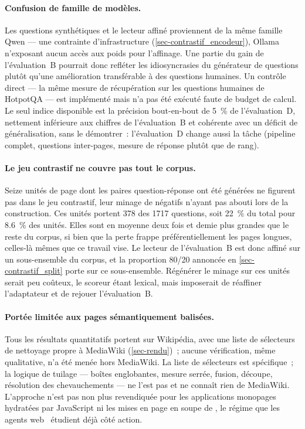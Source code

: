 \paragraph{Confusion de famille de modèles.}
\label{sec-res_limites_famille}
Les questions synthétiques et le lecteur affiné proviennent de la même
famille Qwen --- une contrainte d'infrastructure (\cref{sec-contrastif_encodeur}),
Ollama n'exposant aucun accès aux poids pour l'affinage. Une partie du gain de
l'évaluation~B pourrait donc refléter les idiosyncrasies du générateur de
questions plutôt qu'une amélioration transférable à des questions humaines. Un
contrôle direct --- la même mesure de récupération sur les questions humaines
de HotpotQA --- est implémenté mais n'a pas été exécuté faute de budget de
calcul. Le seul indice disponible est la précision bout-en-bout de
\SI{5}{\percent} de l'évaluation~D, nettement inférieure aux chiffres de
l'évaluation~B et cohérente avec un déficit de généralisation, sans le
démontrer~: l'évaluation~D change aussi la tâche (pipeline complet, questions
inter-pages, mesure de réponse plutôt que de rang).

\paragraph{Le jeu contrastif ne couvre pas tout le corpus.}
\label{sec-res_limites_dataset}
Seize unités de page dont les paires question-réponse ont été générées ne
figurent pas dans le jeu contrastif, leur minage de négatifs n'ayant pas abouti
lors de la construction. Ces unités portent \num{378} des \num{1717} questions,
soit \SI{22}{\percent} du total pour \SI{8.6}{\percent} des unités. Elles sont
en moyenne deux fois et demie plus grandes que le reste du corpus, si bien que la
perte frappe préférentiellement les pages longues, celles-là mêmes que ce travail
vise. Le lecteur de l'évaluation~B est donc affiné sur un sous-ensemble du
corpus, et la proportion \num{80}/\num{20} annoncée en
\cref{sec-contrastif_split} porte sur ce sous-ensemble. Régénérer le minage sur
ces unités serait peu coûteux, le scoreur étant lexical, mais imposerait de
réaffiner l'adaptateur et de rejouer l'évaluation~B.

\paragraph{Portée limitée aux pages sémantiquement balisées.} Tous les
résultats quantitatifs portent sur Wikipédia, avec une liste de sélecteurs de
nettoyage propre à MediaWiki (\cref{sec-rendu})~; aucune vérification, même
qualitative, n'a été menée hors MediaWiki. La liste de sélecteurs est
spécifique~; la logique de tuilage --- boîtes englobantes, mesure serrée,
fusion, découpe, résolution des chevauchements --- ne l'est pas et ne connaît
rien de MediaWiki. L'approche n'est pas non plus revendiquée pour les
applications monopages hydratées par JavaScript ni les mises en page en
soupe de , le régime que les agents web~\citep{webarena2023,
mind2web2023, seeact2024} étudient déjà côté action.

